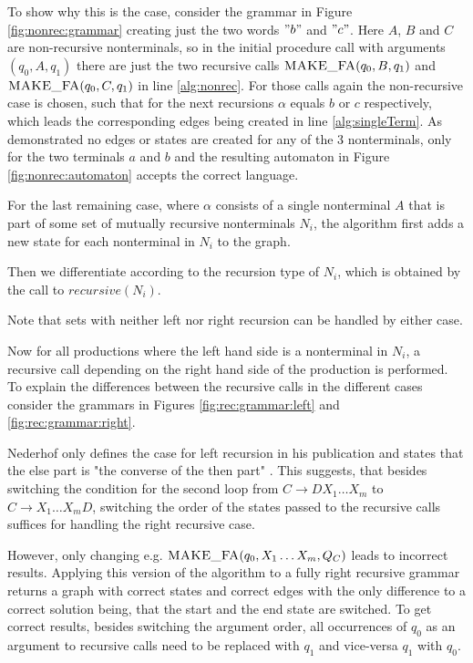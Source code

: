To show why this is the case, consider the grammar in Figure \ref{fig:nonrec:grammar} creating just the two words $"b"$ and $"c"$. Here $A$, $B$ and $C$ are non-recursive nonterminals, so in the initial procedure call with arguments $(q_0, A, q_1)$ there are just the two recursive calls $\textproc{MAKE\_FA}(q_0, B, q_1)$ and $\textproc{MAKE\_FA}(q_0, C, q_1)$ in line \ref{alg:nonrec}. For those calls again the non-recursive case is chosen, such that for the next recursions $\alpha$ equals $b$ or $c$ respectively, which leads the corresponding edges being created in line \ref{alg:singleTerm}. As demonstrated no edges or states are created for any of the 3 nonterminals, only for the two terminals $a$ and $b$ and the resulting automaton in Figure \ref{fig:nonrec:automaton} accepts the correct language.

For the last remaining case, where $\alpha$ consists of a single nonterminal $A$ that is part of some set of mutually recursive nonterminals $N_i$, the algorithm first adds a new state for each nonterminal in $N_i$ to the graph.

Then we differentiate according to the recursion type of $N_i$, which is obtained by the call to $recursive(N_i)$.

Note that sets with neither left nor right recursion can be handled by either case.

Now for all productions where the left hand side is a nonterminal in $N_i$, a recursive call depending on the right hand side of the production is performed. 
To explain the differences between the recursive calls in the different cases consider the grammars in Figures \ref{fig:rec:grammar:left} and \ref{fig:rec:grammar:right}.

Nederhof only defines the case for left recursion in his publication and states that the else part is "the converse of the then part" \cite{nederhof}. This suggests, that besides switching the condition for the second loop from $C \rightarrow DX_1 \ldots X_m$ to  $C \rightarrow X_1 \ldots X_mD$, switching the order of the states passed to the recursive calls suffices for handling the right recursive case.

However, only changing e.g. $\textproc{MAKE\_FA}(q_0, X_1 \ldots X_m, Q_C)$ leads to incorrect results. Applying this version of the algorithm to a fully right recursive grammar returns a graph with correct states and correct edges with the only difference to a correct solution being, that the start and the end state are switched. To get correct results, besides switching the argument order, all occurrences of $q_0$ as an argument to recursive calls need to be replaced with $q_1$ and vice-versa $q_1$ with $q_0$.

